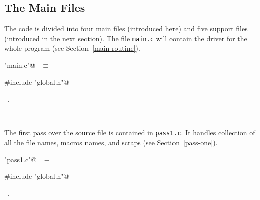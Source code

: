 \documentclass{report}
\begin{document}
\subsection{The Main Files}

The code is divided into four main files (introduced here) and five
support files (introduced in the next section).
The file \verb|main.c| will contain the driver for the whole program
(see Section~\ref{main-routine}).
\begin{flushleft} \small
\begin{minipage}{\linewidth} \label{scrap4}
\verb@"main.c"@\nobreak\ {\footnotesize {} }$\equiv$
\vspace{-1ex}
\begin{list}{}{} \item
\mbox{}\verb@#include "global.h"@\\
\mbox{}\verb@@{\NWsep}
\end{list}
\vspace{-1ex}
\footnotesize\addtolength{\baselineskip}{-1ex}
\begin{list}{}{\setlength{\itemsep}{-\parsep}\setlength{\itemindent}{-\leftmargin}}
\item \NWtxtFileDefBy\ .
\end{list}
\end{minipage}\\[4ex]
\end{flushleft}
The first pass over the source file is contained in \verb|pass1.c|.
It handles collection of all the file names, macros names, and scraps
(see Section~\ref{pass-one}).
\begin{flushleft} \small
\begin{minipage}{\linewidth} \label{scrap5}
\verb@"pass1.c"@\nobreak\ {\footnotesize {} }$\equiv$
\vspace{-1ex}
\begin{list}{}{} \item
\mbox{}\verb@#include "global.h"@\\
\mbox{}\verb@@{\NWsep}
\end{list}
\vspace{-1ex}
\footnotesize\addtolength{\baselineskip}{-1ex}
\begin{list}{}{\setlength{\itemsep}{-\parsep}\setlength{\itemindent}{-\leftmargin}}
\item \NWtxtFileDefBy\ .
\end{list}
\end{minipage}\\[4ex]
\end{flushleft}
\end{document}
